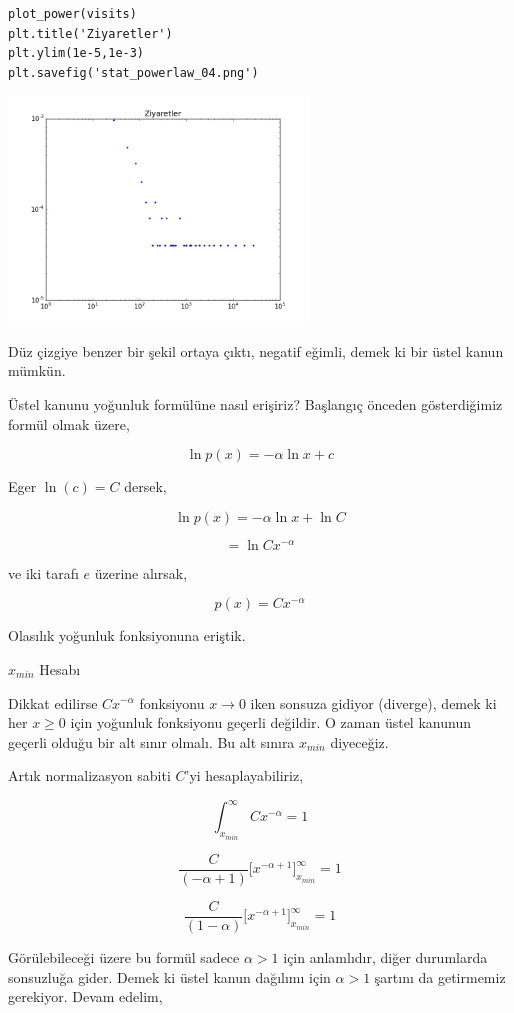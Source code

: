 \documentclass[12pt,fleqn]{article}\usepackage{../../common}
\begin{document}
\begin{verbatim}
plot_power(visits)
plt.title('Ziyaretler')
plt.ylim(1e-5,1e-3)
plt.savefig('stat_powerlaw_04.png')
\end{verbatim}

\includegraphics[height=6cm]{stat_powerlaw_04.png}

Düz çizgiye benzer bir şekil ortaya çıktı, negatif eğimli, demek ki bir
üstel kanun mümkün.

Üstel kanunu yoğunluk formülüne nasıl erişiriz? Başlangıç önceden
gösterdiğimiz formül olmak üzere,

$$ \ln p(x) = -\alpha \ln x + c $$

Eger $\ln(c) = C$ dersek, 

$$ \ln p(x) = -\alpha \ln x + \ln C $$

$$  = \ln C x^{-\alpha}  $$

ve iki tarafı $e$ üzerine alırsak,

$$ p(x) = C x^{-\alpha}  $$

Olasılık yoğunluk fonksiyonuna eriştik. 

$x_{min}$ Hesabı

Dikkat edilirse $C x^{-\alpha}$ fonksiyonu $x \to 0$ iken sonsuza gidiyor
(diverge), demek ki her $x \ge 0$ için yoğunluk fonksiyonu geçerli
değildir. O zaman üstel kanunun geçerli olduğu bir alt sınır olmalı. Bu alt
sınıra $x_{min}$ diyeceğiz.

Artık normalizasyon sabiti $C$'yi hesaplayabiliriz, 

$$ \int_{x_{min}}^{\infty} C x^{-\alpha} = 1$$

$$ \frac{C}{(-\alpha+1) } \bigg[ x^{-\alpha+1} \bigg]_{x_{min}}^{\infty} = 1$$

$$ \frac{C}{(1-\alpha) } \bigg[ x^{-\alpha+1} \bigg]_{x_{min}}^{\infty} = 1$$

Görülebileceği üzere bu formül sadece $\alpha > 1$ için anlamlıdır, diğer
durumlarda sonsuzluğa gider. Demek ki üstel kanun dağılımı 
için $\alpha > 1$ şartını da getirmemiz gerekiyor. Devam edelim,
\end{document}
